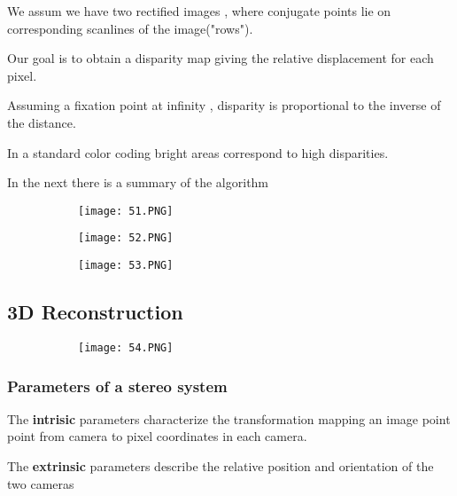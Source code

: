 \documentclass{article}
\begin{document}
We assum we have two rectified images , where conjugate points lie on corresponding scanlines of the image("rows").


Our goal is to obtain a disparity map giving the relative displacement for each pixel.

Assuming a fixation point at infinity , disparity is proportional to the inverse of the distance.

In a standard color coding bright areas correspond to high disparities.

In the next there is a summary of the algorithm

\begin{figure}[ht!]
  \centering
  \begin{subfigure}[b]{0.5\linewidth}
    \texttt{[image: 51.PNG]}
  \end{subfigure}
     \begin{subfigure}[b]{0.49\textwidth}
         \centering
         \texttt{[image: 52.PNG]}
     \end{subfigure}
\end{figure}


\begin{figure}[ht!]
  \centering
  \begin{subfigure}[b]{0.7\linewidth}
    \texttt{[image: 53.PNG]}
  \end{subfigure}
\end{figure}

\subsection{3D Reconstruction}

\begin{figure}[ht!]
  \centering
  \begin{subfigure}[b]{0.5\linewidth}
    \texttt{[image: 54.PNG]}
  \end{subfigure}
\end{figure}

\subsubsection{Parameters of a stereo system}

The \textbf{intrisic} parameters characterize the transformation mapping an image point point from camera to pixel coordinates in each camera.

The \textbf{extrinsic} parameters describe the relative position and orientation of the two cameras
\end{document}
